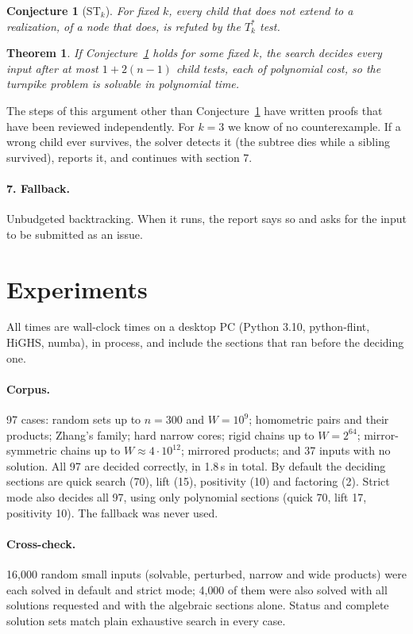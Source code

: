 \documentclass[11pt]{article}
\newtheorem{theorem}[lemma]{Theorem}
\newtheorem{conjecture}[lemma]{Conjecture}
\theoremstyle{definition}
\begin{document}
\begin{conjecture}[$\mathrm{ST}_k$]\label{conj:st}
For fixed $k$, every child that does not extend to a realization, of a node that does, is refuted by the $T^*_k$ test.
\end{conjecture}

\begin{theorem}\label{thm:st}
If Conjecture~\ref{conj:st} holds for some fixed $k$, the search decides every input after at most $1+2(n-1)$ child
tests, each of polynomial cost, so the turnpike problem is solvable in polynomial time.
\end{theorem}

The steps of this argument other than Conjecture~\ref{conj:st} have written proofs that have been reviewed
independently. For $k=3$ we know of no counterexample. If a wrong child ever survives, the solver detects it (the
subtree dies while a sibling survived), reports it, and continues with section 7.

\paragraph{7. Fallback.} Unbudgeted backtracking. When it runs, the report says so and asks for the input to be
submitted as an issue.

\section{Experiments}\label{sec:exp}

All times are wall-clock times on a desktop PC (Python 3.10, python-flint, HiGHS, numba), in process, and include
the sections that ran before the deciding one.

\paragraph{Corpus.} 97 cases: random sets up to $n=300$ and $W=10^9$; homometric pairs and their products; Zhang's
family; hard narrow cores; rigid chains up to $W=2^{64}$; mirror-symmetric chains up to $W\approx 4\cdot10^{12}$;
mirrored products; and 37 inputs with no solution. All 97 are decided correctly, in 1.8\,s in total. By default the
deciding sections are quick search (70), lift (15), positivity (10) and factoring (2). Strict mode also decides all 97,
using only polynomial sections (quick 70, lift 17, positivity 10). The fallback was never used.

\paragraph{Cross-check.} 16{,}000 random small inputs (solvable, perturbed, narrow and wide products) were each solved
in default and strict mode; 4{,}000 of them were also solved with all solutions requested and with the algebraic
sections alone. Status and complete solution sets match plain exhaustive search in every case.
\end{document}

